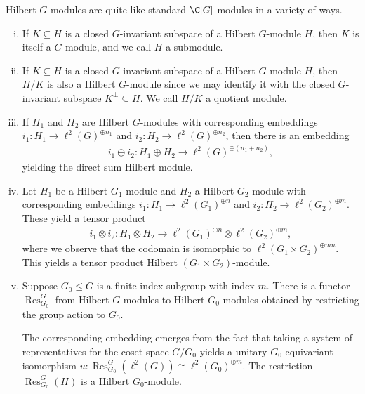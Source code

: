\documentclass[10pt]{mypackage}
\begin{document}
Hilbert $G$-modules are quite like standard $\C[G]$-modules in a variety of ways.
\begin{enumerate}[(i)]
  \item If $K\subseteq H$ is a closed $G$-invariant subspace of a Hilbert $G$-module $H$, then $K$ is itself a $G$-module, and we call $H$ a submodule.
  \item If $K\subseteq H$ is a closed $G$-invariant subspace of a Hilbert $G$-module $H$, then $H/K$ is also a Hilbert $G$-module since we may identify it with the closed $G$-invariant subspace $K^{\perp}\subseteq H$. We call $H/K$ a quotient module.
  \item If $H_1$ and $H_2$ are Hilbert $G$-modules with corresponding embeddings $i_1\colon H_1\rightarrow \ell^2(G)^{\oplus n_1}$ and $i_2\colon H_2\rightarrow \ell^2(G)^{\oplus n_2}$, then there is an embedding
    \begin{align*}
      i_1\oplus i_2\colon H_1\oplus H_2\rightarrow \ell^2(G)^{\oplus \left( n_1 + n_2 \right)},
    \end{align*}
    yielding the direct sum Hilbert module.
  \item Let $H_1$ be a Hilbert $G_1$-module and $H_2$ a Hilbert $G_2$-module with corresponding embeddings $i_1\colon H_1\rightarrow \ell^2\left( G_1 \right)^{\oplus n}$ and $i_2\colon H_2\rightarrow \ell^2\left( G_2 \right)^{\oplus m}$. These yield a tensor product
    \begin{align*}
      i_1\otimes i_2\colon H_1\otimes H_2\rightarrow \ell^2\left( G_1 \right)^{\oplus n} \otimes \ell^2\left( G_2 \right)^{\oplus m},
    \end{align*}
    where we observe that the codomain is isomorphic to $\ell^2\left( G_1\times G_2 \right)^{\oplus mn}$. This yields a tensor product Hilbert $\left( G_1\times G_2 \right)$-module.
  \item Suppose $G_0\leq G$ is a finite-index subgroup with index $m$. There is a functor $\operatorname{Res}_{G_0}^{G}$ from Hilbert $G$-modules to Hilbert $G_0$-modules obtained by restricting the group action to $G_0$.

    The corresponding embedding emerges from the fact that taking a system of representatives for the coset space $G/G_0$ yields a unitary $G_0$-equivariant isomorphism $u\colon \operatorname{Res}_{G_0}^{G} \left( \ell^2(G) \right)\cong \ell^2\left( G_0 \right)^{\oplus m}$. The restriction $\operatorname{Res}_{G_0}^{G}\left( H \right)$ is a Hilbert $G_0$-module.
\end{enumerate}
\end{document}

